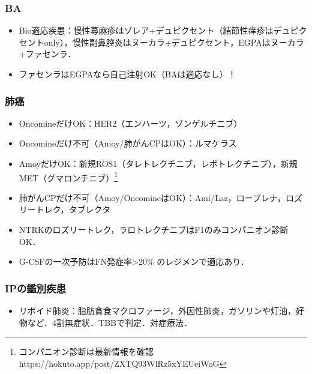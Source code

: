 \subsubsection{BA}

\begin{itemize}

\item Bio適応疾患：慢性蕁麻疹はゾレア+デュピクセント（結節性痒疹はデュピクセントonly），慢性副鼻腔炎はヌーカラ+デュピクセント，EGPAはヌーカラ+ファセンラ．
\item ファセンラはEGPAなら自己注射OK（BAは適応なし）！


\end{itemize}

\subsubsection{肺癌}
\begin{itemize}
\item OncomineだけOK：HER2（エンハーツ，ゾンゲルチニブ）
\item Oncomineだけ不可（Amoy/肺がんCPはOK）：ルマケラス
\item AmoyだけOK：新規ROS1（タレトレクチニブ，レポトレクチニブ），新規MET（グマロンチニブ）\footnote{コンパニオン診断は最新情報を確認 https://hokuto.app/post/ZXTQ93WlRz5xYEUeiWoG}
\item 肺がんCPだけ不可（Amoy/OncomineはOK）：Ami/Laz，ローブレナ，ロズリートレク，タブレクタ
\item NTRKのロズリートレク，ラロトレクチニブはF1のみコンパニオン診断OK．


\item G-CSFの一次予防はFN発症率>20\% のレジメンで適応あり．


\end{itemize}


\subsubsection{IPの鑑別疾患}
\begin{itemize}

\item リポイド肺炎：脂肪貪食マクロファージ，外因性肺炎，ガソリンや灯油，好物など．4割無症状．TBBで判定．対症療法．

\end{itemize}




